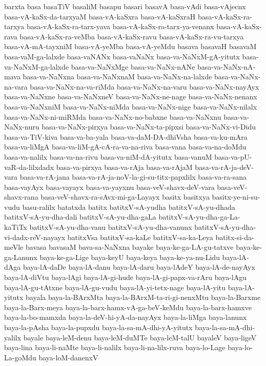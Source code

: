 {barxta
basa
basaTiV
basaliM
basapu
basari
basavA
basa-vAdi
basa-vAjecnx
basa-vA-kaSx-da-tarxyaM
basa-vA-kaSxra
basa-vA-kaSxraH
basa-vA-kaSx-ra-tarxya
basa-vA-kaSx-ra-tarx-yava
basa-vA-kaSx-ra-tarx-ya-venanx
basa-vA-kaSx-rava
basa-vA-kaSx-ra-veMba
basa-vA-kaSx-ravu
basa-vA-kaSx-ra-vu-tarxya
basa-vA-mA-tayxniM
basa-vA-yeMba
basa-vA-yeMdu
basava
basavaH
basavaM
basa-vaM-ga-lalxde
basa-vaNANx
basa-vaNaNx
basa-va-NaNxM-gA-yitutx
basa-va-NaNxM-ga-lalxde
basa-va-NaNxMge
basa-va-NaNx-nANe
basa-va-NaNx-nA-mava
basa-va-NaNxna
basa-va-NaNxnaM
basa-va-NaNx-na-lalxde
basa-va-NaNx-na-vara
basa-va-NaNx-na-va-riMda
basa-va-NaNx-na-varu
basa-va-NaNx-nayAyx
basa-va-NaNxne
basa-va-NaNxneV
basa-va-NaNx-ne-nage
basa-va-NaNx-nenanx
basa-va-NaNxniM
basa-va-NaNx-niMda
basa-va-NaNx-nige
basa-va-NaNx-nilalx
basa-va-NaNx-ni-miRMda
basa-va-NaNx-no-babxne
basa-va-NaNxnu
basa-va-NaNx-nuru
basa-va-NaNx-pirxya
basa-va-NaNx-ta-pipxsi
basa-va-NaNx-vi-Didu
basa-va-TiV-kiva
basa-va-ba-yala
basa-va-daM-DA-dhiVsha
basa-va-ku-mAra
basa-va-liMgA
basa-va-liM-gA-cA-ra-va-na-riva
basa-vana
basa-va-na-doMdu
basa-va-nalilx
basa-va-na-rivu
basa-va-niM-dA-yitutx
basa-vanuM
basa-va-pU-vaR-da-lilxdadx
basa-va-pirxya
basa-va-rAja
basa-va-rAjaM
basa-va-rA-ja-deV-vara
basa-va-rA-jana
basa-va-rA-ja-noV-la-gi-su-titx-papxlilx
basa-va-ra-sana
basa-vayAyx
basa-vayayx
basa-va-yayxnu
basa-veV-shavx-deV-vara
basa-veV-shavx-rana
basa-veV-shavx-ra-sAvx-mi-ga-Layayx
basitx
basitxya
basitx-ye-ni-su-vudu
basu-ralilx
batatxda
batitx
batitxV-sA-yudha
batitxV-sA-yu-dhada
batitxV-sA-yu-dha-dali
batitxV-sA-yu-dha-gaLa
batitxV-sA-yu-dha-ga-La-kaTiTx
batitxV-sA-yu-dha-vanu
batitxV-sA-yu-dha-vanunx
batitxV-sA-yu-dha-vi-dadx-reV-nayayx
batitxVsa
batitxV-sa-kaLe
batitxV-sa-ka-Leya
batitx-si-da-meVle
bavasa
bavasaM
bava-sa-NaNxna
bayake
baya-ke-ga-LA-gu-tatxve
baya-ke-ga-Lanunx
baya-ke-ga-Lige
baya-keyU
baya-keya
baya-ke-ya-nu-Lidu
baya-lA-dAga
baya-lA-daDe
baya-lA-danu
baya-lA-daru
baya-lAdeY
baya-lA-de-nayAyx
baya-lA-diVtu
baya-lAgi
baya-lA-gi-hude
baya-lA-gi-papx-va-rAru
baya-lAgu
baya-lA-gu-tAtxne
baya-lA-gu-vudu
baya-lA-yi-tetx-nage
baya-lA-yitu
baya-lA-yitutx
bayala
baya-la-BArxMta
baya-la-BArxM-ta-ri-gi-nenxMtu
baya-la-Barxme
baya-la-Barx-meya
baya-la-barx-hamx-vA-ga-beV-keMdu
baya-la-barx-hamxve
baya-la-bo-mamxda
baya-la-deV-hi-yA-da-nayAyx
baya-la-liMga
baya-lanunx
baya-la-pAsha
baya-la-pupxdu
baya-la-sa-mA-dhi-yA-yitutx
baya-la-sa-mA-dhi-yalilx
bayale
baya-leM-denu
baya-leM-duMTe
baya-leM-talU
bayaleV
baya-ligeV
baya-lina
baya-li-naMte
baya-li-nalilx
baya-li-na-lilx-ruva
baya-lo-Lage
baya-lo-La-goMdu
baya-loM-danenxV
}
